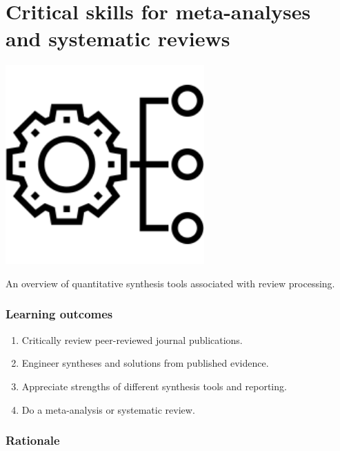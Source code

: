 \documentclass[
]{book}
\author{cjlortie}
\date{}
\providecommand{\tightlist}{%
  \setlength{\itemsep}{0pt}\setlength{\parskip}{0pt}}
\begin{document}
{
\setcounter{tocdepth}{1}
\tableofcontents
}
\hypertarget{critical-skills-for-meta-analyses-and-systematic-reviews}{%
\chapter{Critical skills for meta-analyses and systematic reviews}\label{critical-skills-for-meta-analyses-and-systematic-reviews}}

\includegraphics[width=3in,height=\textheight]{./synthesis.png}

An overview of quantitative synthesis tools associated with review processing.

\hypertarget{learning-outcomes}{%
\subsection*{Learning outcomes}\label{learning-outcomes}}

\begin{enumerate}
\def\labelenumi{\arabic{enumi}.}
\tightlist
\item
  Critically review peer-reviewed journal publications.\\
\item
  Engineer syntheses and solutions from published evidence.\\
\item
  Appreciate strengths of different synthesis tools and reporting.\\
\item
  Do a meta-analysis or systematic review.
\end{enumerate}

\hypertarget{rationale}{%
\subsection*{Rationale}\label{rationale}}
\end{document}
